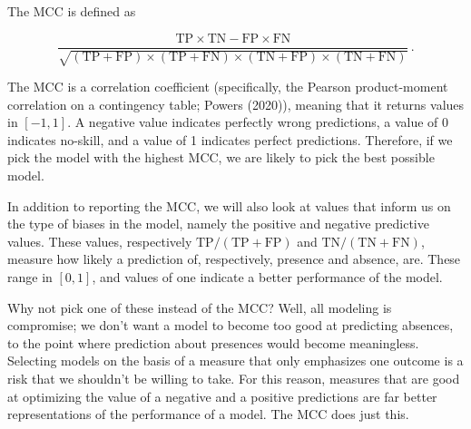 \documentclass[
  letterpaper,
]{scrbook}
\begin{document}
The MCC is defined as

\[
\frac{\text{TP}\times \text{TN} - \text{FP}\times \text{FN}}{\sqrt{(\text{TP}+\text{FP})\times (\text{TP}+\text{FN})\times (\text{TN}+\text{FP})\times (\text{TN}+\text{FN})}} \,.
\]

The MCC is a correlation coefficient (specifically, the Pearson
product-moment correlation on a contingency table; Powers (2020)),
meaning that it returns values in \([-1, 1]\). A negative value
indicates perfectly wrong predictions, a value of 0 indicates no-skill,
and a value of 1 indicates perfect predictions. Therefore, if we pick
the model with the highest MCC, we are likely to pick the best possible
model.

In addition to reporting the MCC, we will also look at values that
inform us on the type of biases in the model, namely the positive and
negative predictive values. These values, respectively
\(\text{TP}/(\text{TP}+\text{FP})\) and
\(\text{TN}/(\text{TN}+\text{FN})\), measure how likely a prediction of,
respectively, presence and absence, are. These range in \([0,1]\), and
values of one indicate a better performance of the model.

Why not pick one of these instead of the MCC? Well, all modeling is
compromise; we don't want a model to become too good at predicting
absences, to the point where prediction about presences would become
meaningless. Selecting models on the basis of a measure that only
emphasizes one outcome is a risk that we shouldn't be willing to take.
For this reason, measures that are good at optimizing the value of a
negative and a positive predictions are far better representations of
the performance of a model. The MCC does just this.

{
\makeatletter
\def\LT@makecaption#1#2#3{%
  \noalign{\smash{\hbox{\kern\textwidth\rlap{\kern\marginparsep
  \parbox[t]{\marginparwidth}{%
    \footnotesize{%
      \vspace{(1.1\baselineskip)}
    #1{#2: }\ignorespaces #3}}}}}}%
    }
\makeatother

\begin{figure}[bt]



\end{figure}%

}
\end{document}

